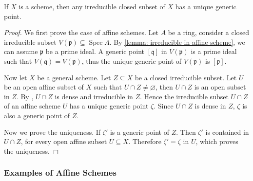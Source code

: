 \documentclass[11pt]{article}
\newcommand{\Spec}{\operatorname{Spec}}
\begin{document}
\begin{proposition}
    \cite[Exercise II.2.9]{hartsAG}
    If $ X $ is a scheme, then any irreducible closed subset of $ X $ has a unique generic point. 
\end{proposition}

\begin{proof}
    We first prove the case of affine schemes. 
    Let $ A $ be a ring, consider a closed irreducible subset $ V(\mathfrak{p}) \subseteq \Spec A $. 
    By \autoref{lemma: irreducible in affine scheme}, we can assume $ \mathfrak{p} $ be a prime ideal. 
    A generic point $ [\mathfrak{q}] $ in $ V(\mathfrak{p})$ is a prime ideal such that 
    $ V(\mathfrak{q})=V(\mathfrak{p}) $, thus the unique generic point of $  V(\mathfrak{p}) $ is $ [\mathfrak{p}]$.  

    Now let $ X $ be a general scheme. Let $ Z \subseteq X $ be a closed irreducible subset. 
    Let $ U $ be an open affine subset of $ X $ such that $ U \cap Z \neq \varnothing $, 
    then $ U \cap Z $ is an open subset in $ Z $. By \cite[Example I.1.1.3]{hartsAG}, 
    $ U \cap Z $ is dense and irreducible in $ Z $. Hence the irreducible subset 
    $ U \cap Z $ of an affine scheme $ U $ has a unique generic point $ \zeta $. 
    Since $ U \cap Z $ is dense in $ Z $, $ \zeta $ is also a generic point of $ Z $. 

    Now we prove the uniqueness. If $ \zeta' $ is a generic point of $ Z $. 
    Then $ \zeta' $ is contained in $ U \cap Z $, for every open affine subset $ U \subseteq X $. 
    Therefore $ \zeta'=\zeta $ in $ U $, which proves the uniqueness. 
\end{proof}




\subsubsection{Examples of Affine Schemes}



\begin{example}
    \cite[Example II.2.3.3, Exercise II.2.10]{hartsAG}
    
\end{example}

\begin{example}
    \cite[Example II.2.3.4]{hartsAG}
    
\end{example}

\begin{example}
    \cite[Exercise II.2.11]{hartsAG}
    
\end{example}
\end{document}
